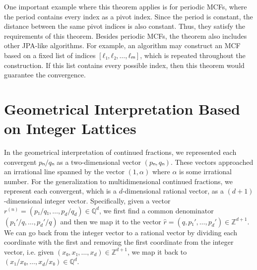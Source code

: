 One important example where this theorem applies is for periodic MCFs,
where the period contains every index as a pivot index.
Since the period is constant,
the distance between the same pivot indices is also constant.
Thus, they satisfy the requirements of this theorem.
Besides periodic MCFs, the theorem also includes other JPA-like algorithms.
For example, an algorithm may construct an MCF based on a fixed list of indices $[ℓ₁, ℓ₂, …, ℓₘ]$,
which is repeated throughout the construction.
If this list contains every possible index,
then this theorem would guarantee the convergence.

\section{Geometrical Interpretation Based on Integer Lattices}
\label{sec:mdcf-geometry}

In the geometrical interpretation of continued fractions,
we represented each convergent $pₙ/qₙ$ as a two-dimensional vector $(pₙ, qₙ)$.
These vectors approached an irrational line spanned by the vector $(1, α)$
where $α$ is some irrational number.
For the generalization to multidimensional continued fractions,
we represent each convergent,
which is a $d$-dimensional rational vector,
as a $(d+1)$-dimensional integer vector.
Specifically, given a vector $r^{(n)} = (p₁/q₁, …, p_d/q_d) ∈ ℚ^d$,
we first find a common denominator $(p₁'/q, …, p_d'/q)$ and
then we map it to the vector $\hat r = (q, p₁', …, p_d') ∈ ℤ^{d+1}$.
We can go back from the integer vector to a rational vector
by dividing each coordinate with the first and
removing the first coordinate from the integer vector,
i.e. given $(x₀, x₁, …, x_d) ∈ ℤ^{d+1}$, we map it back to $(x₁/x₀, …, x_d/x₀) ∈ ℚ^d$.

